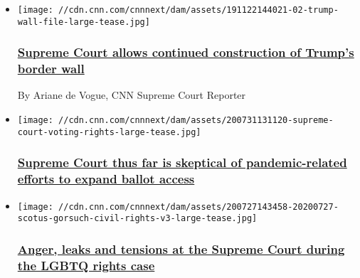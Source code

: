 \begin{itemize}
\item
  \href{/2020/07/31/politics/supreme-court-border-wall/index.html}{}

  \texttt{[image: //cdn.cnn.com/cnnnext/dam/assets/191122144021-02-trump-wall-file-large-tease.jpg]}

  \hypertarget{supreme-court-allows-continued-construction-of-trumps-border-wall}{%
  \subsubsection{\texorpdfstring{\href{/2020/07/31/politics/supreme-court-border-wall/index.html}{Supreme
  Court allows continued construction of Trump's border
  wall}}{Supreme Court allows continued construction of Trump's border wall}}\label{supreme-court-allows-continued-construction-of-trumps-border-wall}}

  By Ariane de Vogue, CNN Supreme Court Reporter
\item
  \href{/2020/07/31/politics/supreme-court-voting-covid-trump-obama/index.html}{}

  \texttt{[image: //cdn.cnn.com/cnnnext/dam/assets/200731131120-supreme-court-voting-rights-large-tease.jpg]}

  \hypertarget{supreme-court-thus-far-is-skeptical-of-pandemic-related-efforts-to-expand-ballot-access}{%
  \subsubsection{\texorpdfstring{\href{/2020/07/31/politics/supreme-court-voting-covid-trump-obama/index.html}{Supreme
  Court thus far is skeptical of pandemic-related efforts to expand
  ballot
  access}}{Supreme Court thus far is skeptical of pandemic-related efforts to expand ballot access}}\label{supreme-court-thus-far-is-skeptical-of-pandemic-related-efforts-to-expand-ballot-access}}
\item
  \href{/2020/07/28/politics/neil-gorsuch-supreme-court-lgbtq-civil-rights-act-alito/index.html}{}

  \texttt{[image: //cdn.cnn.com/cnnnext/dam/assets/200727143458-20200727-scotus-gorsuch-civil-rights-v3-large-tease.jpg]}

  \hypertarget{anger-leaks-and-tensions-at-the-supreme-court-during-the-lgbtq-rights-case}{%
  \subsubsection{\texorpdfstring{\href{/2020/07/28/politics/neil-gorsuch-supreme-court-lgbtq-civil-rights-act-alito/index.html}{Anger,
  leaks and tensions at the Supreme Court during the LGBTQ rights
  case}}{Anger, leaks and tensions at the Supreme Court during the LGBTQ rights case}}\label{anger-leaks-and-tensions-at-the-supreme-court-during-the-lgbtq-rights-case}}
\end{itemize}

